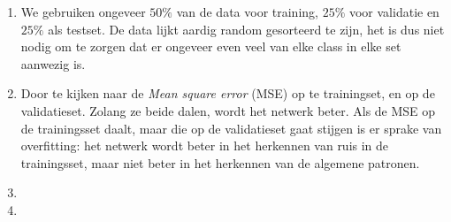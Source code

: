 \documentclass[a4paper,10pt,fleqn]{article}
\begin{document}
\begin{enumerate}[1.]
\begin{center}
	\end{center}

	\item We gebruiken ongeveer $50\%$ van de data voor training, $25\%$ voor validatie en $25\%$ als testset. De data lijkt aardig random gesorteerd te zijn, het is dus niet nodig om te zorgen dat er ongeveer even veel van elke class in elke set aanwezig is.

	\item Door te kijken naar de \textit{Mean square error} (MSE) op te trainingset, en op de validatieset. Zolang ze beide dalen, wordt het netwerk beter. Als de MSE op de trainingsset daalt, maar die op de validatieset gaat stijgen is er sprake van overfitting: het netwerk wordt beter in het herkennen van ruis in de trainingsset, maar niet beter in het herkennen van de algemene patronen.

	\item

	\item


\end{enumerate}
\end{document}
